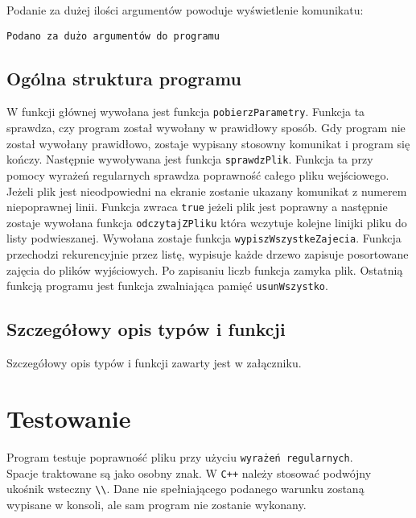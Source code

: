 \documentclass[12pt,a4paper,twoside]{article}
\let\oldmarginpar\marginpar
\renewcommand\marginpar[1]{%
  {\linespread{0.85}\normalfont\scriptsize%
\oldmarginpar[\hspace{1cm}\begin{minipage}{3cm}\raggedleft\scriptsize\color{black}\textsf{#1}\end{minipage}]%
{\hspace{0cm}\begin{minipage}{3cm}\raggedright\scriptsize\color{black}\textsf{#1}\end{minipage}}%
}%
}
\begin{document}
Podanie za dużej ilości argumentów powoduje wyświetlenie komunikatu:
\begin{verbatim}
Podano za dużo argumentów do programu
\end{verbatim}




\subsection{Ogólna struktura programu}
\marginpar{}
W funkcji głównej wywołana jest funkcja \lstinline|pobierzParametry|.
Funkcja ta sprawdza, czy program został wywołany w prawidłowy sposób. Gdy program nie został wywołany prawidłowo, zostaje wypisany stosowny komunikat i program się kończy.
Następnie wywoływana jest funkcja \lstinline|sprawdzPlik|.
Funkcja ta przy pomocy wyrażeń regularnych sprawdza poprawność całego pliku wejściowego. Jeżeli plik jest nieodpowiedni na ekranie zostanie ukazany komunikat z numerem niepoprawnej linii.
Funkcja zwraca \texttt{true} jeżeli plik jest poprawny a następnie zostaje wywołana funkcja \lstinline|odczytajZPliku| która wczytuje kolejne linijki pliku do listy podwieszanej.
Wywołana zostaje funkcja \lstinline|wypiszWszystkeZajecia|.
Funkcja przechodzi rekurencyjnie przez listę, wypisuje każde drzewo zapisuje posortowane zajęcia do plików wyjściowych. Po zapisaniu liczb funkcja zamyka plik. 
Ostatnią funkcją programu jest funkcja zwalniająca pamięć \lstinline|usunWszystko|.


\subsection{Szczegółowy opis typów i funkcji}

Szczegółowy opis typów i funkcji zawarty jest w załączniku. 

\section{Testowanie}
\marginpar{}

Program testuje poprawność pliku przy użyciu \texttt{wyrażeń regularnych}. \\
Spacje traktowane są jako osobny znak. W \texttt{C++} należy stosować podwójny ukośnik wsteczny \lstinline|\\|. Dane nie spełniającego podanego warunku zostaną wypisane w konsoli, ale sam program nie zostanie wykonany. \newline \newline
\noindent {}
\newline
\end{document}
